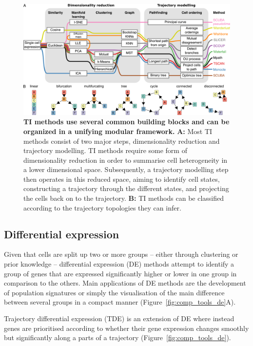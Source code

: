 \begin{figure}[htb!]
	\centering
	\includegraphics[width=.9\linewidth]{fig/ti_metro} 
	\caption{
		\textbf{TI methods use several common building blocks and can be organized in a unifying modular framework.} 
		\textbf{A:} Most TI methods consist of two major steps, dimensionality reduction and trajectory modelling. TI methods   require some form of dimensionality reduction in order to summarise cell heterogeneity in a lower dimensional space. Subsequently, a trajectory modelling step then operates in this reduced space, aiming to identify cell states, constructing a trajectory through the different states, and projecting the cells back on to the trajectory. 
		\textbf{B:} TI methods can be classified according to the trajectory topologies they can infer.
	}
	\label{fig:ti_metro}
\end{figure}


\subsection{Differential expression}
Given that cells are split up two or more groups -- either through clustering or prior knowledge -- differential expression (DE) methods attempt to identify a group of genes that are expressed significantly higher or lower in one group in comparison to the others. Main applications of DE methods are the development of population signatures or simply the visualisation of the main difference between several groups in a compact manner (Figure~\ref{fig:comp_tools_de}A). 
 
Trajectory differential expression (TDE) is an extension of DE where instead genes are prioritised according to whether their gene expression changes smoothly but significantly along a parts of a trajectory (Figure~\ref{fig:comp_tools_de}). 

